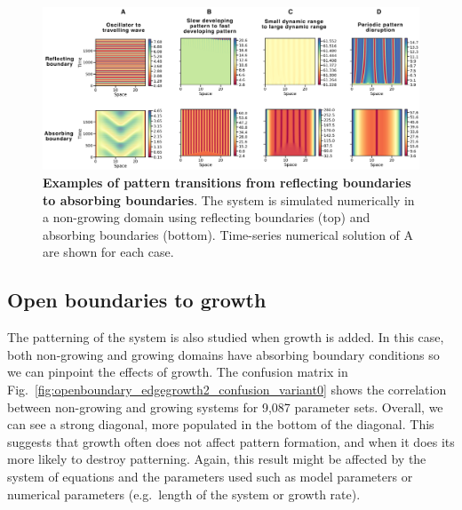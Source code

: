 \begin{figure}[H] %
    \centering
    \begin{adjustbox}{center}
        \includegraphics[width=1\textwidth]{chapters/Chapter 1/interesting_cases_openboundary} %
    \end{adjustbox}
    \caption{\textbf{Examples of pattern transitions from reflecting boundaries to absorbing boundaries}. The system is simulated numerically in a non-growing domain using reflecting boundaries (top) and absorbing boundaries (bottom). Time-series numerical solution of A are shown for each case.}
    \label{fig:interesting_cases_openboundary}
\end{figure}

\subsection{Open boundaries to growth}
The patterning of the system is also studied when growth is added.
In this case, both non-growing and growing domains have absorbing boundary conditions so we can pinpoint the effects of growth.
The confusion matrix in Fig.~\ref{fig:openboundary_edgegrowth2_confusion_variant0} shows the correlation between non-growing and growing systems for 9,087 parameter sets.
Overall, we can see a strong diagonal, more populated in the bottom of the diagonal.
This suggests that growth often does not affect pattern formation, and when it does its more likely to destroy patterning.
Again, this result might be affected by the system of equations and the parameters used such as model parameters or numerical parameters (e.g.~length of the system or growth rate).

